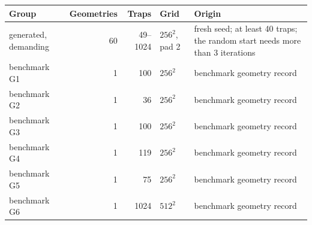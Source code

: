 \begin{tabular}{@{}lrrll@{}}
\toprule
Group & Geometries & Traps & Grid & Origin \\
\midrule
generated, demanding & 60 & 49--1024 & $256^2$, pad 2 & fresh seed; at least 40 traps; the random start needs more than 3 iterations \\
benchmark G1 & 1 & 100 & $256^2$ & benchmark geometry record \\
benchmark G2 & 1 & 36 & $256^2$ & benchmark geometry record \\
benchmark G3 & 1 & 100 & $256^2$ & benchmark geometry record \\
benchmark G4 & 1 & 119 & $256^2$ & benchmark geometry record \\
benchmark G5 & 1 & 75 & $256^2$ & benchmark geometry record \\
benchmark G6 & 1 & 1024 & $512^2$ & benchmark geometry record \\
\bottomrule
\end{tabular}

